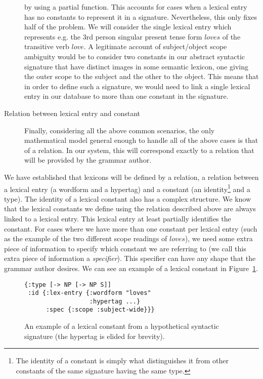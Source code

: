 \begin{description}
    by using a partial function. This accounts for cases when a lexical
    entry has no constants to represent it in a signature. Nevertheless,
    this only fixes half of the problem. We will consider the single
    lexical entry which represents e.g. the 3rd person singular present
    tense form $loves$ of the transitive verb $love$. A legitimate
    account of subject/object scope ambiguity would be to consider two
    constants in our abstract syntactic signature that have distinct
    images in some semantic lexicon, one giving the outer scope to the
    subject and the other to the object. This means that in order to
    define such a signature, we would need to link a single lexical
    entry in our database to more than one constant in the signature.
  \item[Relation between lexical entry and constant] Finally,
    considering all the above common scenarios, the only mathematical
    model general enough to handle all of the above cases is that of a
    relation. In our system, this will correspond exactly to a relation
    that will be provided by the grammar author.
\end{description}

We have established that lexicons will be defined by a relation, a
relation between a lexical entry (a wordform and a hypertag) and a
constant (an identity\footnote{The identity of a constant is simply what
  distinguishes it from other constants of the same signature having the
  same type.} and a type). The identity of a lexical constant also has a
complex structure. We know that the lexical constants we define using
the relation described above are always linked to a lexical entry. This
lexical entry at least partially identifies the constant. For cases
where we have more than one constant per lexical entry (such as the
example of the two different scope readings of $loves$), we need some
extra piece of information to specify which constant we are referring to
(we call this extra piece of information a \emph{specifier}). This
specifier can have any shape that the grammar author desires. We can see
an example of a lexical constant in Figure~\ref{fig:lex-const}.

\begin{figure}
  \centering
  \begin{verbatim}
{:type [-> NP [-> NP S]]
 :id {:lex-entry {:wordform "loves"
                  :hypertag ...}
      :spec {:scope :subject-wide}}}
  \end{verbatim}
  \caption{\label{fig:lex-const} An example of a lexical constant from a
    hypothetical syntactic signature (the hypertag is elided for brevity).}
\end{figure}

